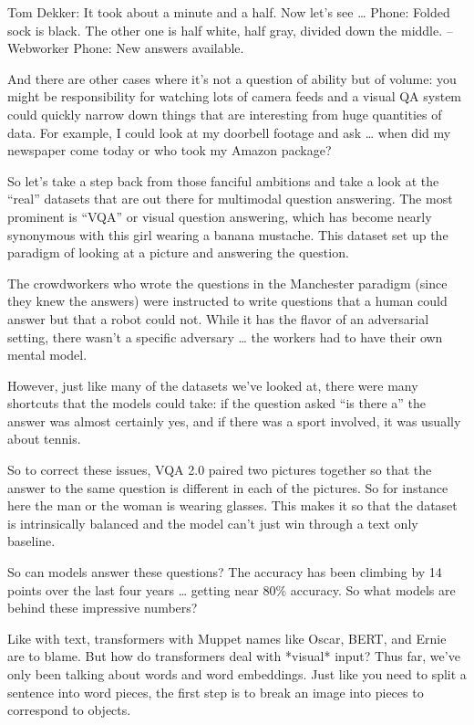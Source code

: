 Tom Dekker: It took about a minute and a half.  Now let’s see …
Phone: Folded sock is black.  The other one is half white, half gray, divided down the middle.  –Webworker
Phone: New answers available.

And there are other cases where it’s not a question of ability but of volume: you might be responsibility for watching lots of camera feeds and a visual QA system could quickly narrow down things that are interesting from huge quantities of data.  For example, I could look at my doorbell footage and ask … when did my newspaper come today or who took my Amazon package?

So let’s take a step back from those fanciful ambitions and take a look at the “real” datasets that are out there for multimodal question answering.  The most prominent is “VQA” or visual question answering, which has become nearly synonymous with this girl wearing a banana mustache.  This dataset set up the paradigm of looking at a picture and answering the question.

The crowdworkers who wrote the questions in the Manchester paradigm (since they knew the answers) were instructed to write questions that a human could answer but that a robot could not.  While it has the flavor of an adversarial setting, there wasn’t a specific adversary … the workers had to have their own mental model.

However, just like many of the datasets we’ve looked at, there were many shortcuts that the models could take: if the question asked “is there a” the answer was almost certainly yes, and if there was a sport involved, it was usually about tennis.

So to correct these issues, VQA 2.0 paired two pictures together so that the answer to the same question is different in each of the pictures.  So for instance here the man or the woman is wearing glasses.  This makes it so that the dataset is intrinsically balanced and the model can’t just win through a text only baseline.

So can models answer these questions?  The accuracy has been climbing by 14 points over the last four years … getting near 80\% accuracy.  So what models are behind these impressive numbers?

Like with text, transformers with Muppet names like Oscar, BERT, and Ernie are to blame.  But how do transformers deal with *visual* input?  Thus far, we’ve only been talking about words and word embeddings.  Just like you need to split a sentence into word pieces, the first step is to break an image into pieces to correspond to objects.  

